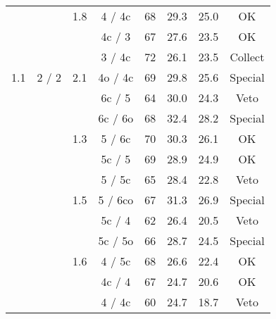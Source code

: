 \begin{tabular}{|c|c|c|c|c|c|c|c|}
 					  & 						& \multirow{-3}{*}{1.8} & 4 / 4c & 68 & 29.3 & 25.0 & OK \\
\cline{3-8} 
 					  & 						& 					    & 4c / 3 & 67 & 27.6 & 23.5 & OK \\
 					  & 						& 					    & {\color[HTML]{FE0000}3 / 4c} & {\color[HTML]{FE0000}72} & {\color[HTML]{FE0000}26.1} & {\color[HTML]{FE0000}23.5} & {\color[HTML]{FE0000}Collect} \\
\multirow{-15}{*}{1.1} & \multirow{-15}{*}{2 / 2} & \multirow{-3}{*}{2.1} & {\color[HTML]{3166FF}4o / 4c} & {\color[HTML]{3166FF}69} & {\color[HTML]{3166FF}29.8} & {\color[HTML]{3166FF}25.6} & {\color[HTML]{3166FF}Special} \\

\hline

 					  & 					  & 					  & {\color[HTML]{009901}6c / 5} & {\color[HTML]{009901}64} & {\color[HTML]{009901}30.0} & {\color[HTML]{009901}24.3} & {\color[HTML]{009901}Veto} \\
 					  & 					  & 					  & {\color[HTML]{3166FF}6c / 6o} & {\color[HTML]{3166FF}68} & {\color[HTML]{3166FF}32.4} & {\color[HTML]{3166FF}28.2} & {\color[HTML]{3166FF}Special} \\
 					  & 					  & \multirow{-3}{*}{1.3} & 5 / 6c & 70 & 30.3 & 26.1 & OK \\
\cline{3-8} 
 					  & 					  & 					  & 5c / 5 & 69 & 28.9 & 24.9 & OK \\
 					  & 					  & 						& {\color[HTML]{009901}5 / 5c} & {\color[HTML]{009901}65} & {\color[HTML]{009901}28.4} & {\color[HTML]{009901}22.8} & {\color[HTML]{009901}Veto} \\
 					  & 						& \multirow{-3}{*}{1.5} & {\color[HTML]{3166FF}5 / 6co} & {\color[HTML]{3166FF}67} & {\color[HTML]{3166FF}31.3} & {\color[HTML]{3166FF}26.9} & {\color[HTML]{3166FF}Special} \\
\cline{3-8} 
 					  & 					  & 						& {\color[HTML]{009901}5c / 4} & {\color[HTML]{009901}62} & {\color[HTML]{009901}26.4} & {\color[HTML]{009901}20.5} & {\color[HTML]{009901}Veto} \\
 					  & 					  & 					  & {\color[HTML]{3166FF}5c / 5o} & {\color[HTML]{3166FF}66} & {\color[HTML]{3166FF}28.7} & {\color[HTML]{3166FF}24.5} & {\color[HTML]{3166FF}Special} \\
 					  & 					  & \multirow{-3}{*}{1.6} & 4 / 5c & 68 & 26.6 & 22.4 & OK \\
\cline{3-8} 
 					  & 					  & 					  & 4c / 4 & 67 & 24.7 & 20.6 & OK \\
 					  & 					  & 						& {\color[HTML]{009901}4 / 4c} & {\color[HTML]{009901}60} & {\color[HTML]{009901}24.7} & {\color[HTML]{009901}18.7} & {\color[HTML]{009901}Veto} \\

\end{tabular}

